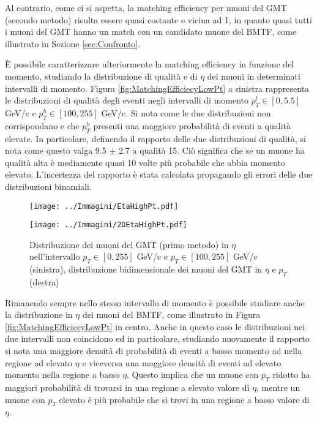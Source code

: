 Al contrario, come ci si aspetta, la matching efficiency per muoni del GMT (secondo metodo) risulta essere quasi costante e vicina ad 1, in quanto quasi tutti i muoni del GMT hanno un match con un candidato muone del BMTF, come illustrato in Sezione \ref{sec:Confronto}. 


È possibile caratterizzare ulteriormente la matching efficiency in funzione del momento, studiando la distribuzione di qualità e di $\eta$ dei muoni in determinati intervalli di momento. Figura \ref{fig:MatchingEfficiecyLowPt} a sinistra rappresenta le distribuzioni di qualità degli eventi negli intervalli di momento $p_T^l \in [0, 5.5]$ GeV/c e $p_T^h \in [100, 255]$ GeV/c. Si nota come le due distribuzioni non corrispondano e che $p_T^h$ presenti una maggiore probabilità di eventi a qualità elevate. In particolare, definendo il rapporto delle due distribuzioni di qualità, si nota come questo valga 9.5 $\pm$ 2.7 a qualità 15. Ciò significa che se un muone ha qualità alta è mediamente quasi 10 volte più probabile che abbia momento elevato. L'incertezza del rapporto è stata calcolata propagando gli errori delle due distribuzioni binomiali.

\begin{figure}[t]
  \centering
  \begin{minipage}[b]{0.47\textwidth}
    \centering
    \texttt{[image: ../Immagini/EtaHighPt.pdf]} 
    \end{minipage}
    \hfill 
    \begin{minipage}[b]{0.51\textwidth}
      \centering
      \texttt{[image: ../Immagini/2DEtaHighPt.pdf]}
    \end{minipage}
    \caption{Distribuzione dei muoni del GMT (primo metodo) in $\eta$  nell'intervallo $p_T \in [0, 255]$ GeV/c e $p_T \in [100, 255]$ GeV/c (sinistra), distribuzione bidimensionale dei muoni del GMT in $\eta$ e $p_T$ (destra)}
  \label{fig:MatchingEfficiecyPt2}
\end{figure}

Rimanendo sempre nello stesso intervallo di momento è possibile studiare anche la distribuzione in $\eta$ dei muoni del BMTF, come illustrato in Figura \ref{fig:MatchingEfficiecyLowPt} in centro. Anche in questo caso le distribuzioni nei due intervalli non coincidono ed in particolare, studiando nuovamente il rapporto si nota una maggiore densità di probabilità di eventi a basso momento ad nella regione ad elevato $\eta$ e viceversa una maggiore densità di eventi ad elevato momento nella regione a basso $\eta$. \newline
Questo implica che un muone con $p_T$ ridotto ha maggiori probabilità di trovarsi in una regione a elevato valore di $\eta$, mentre un muone con $p_T$ elevato è più probabile che si trovi in una regione a basso valore di $\eta$.




